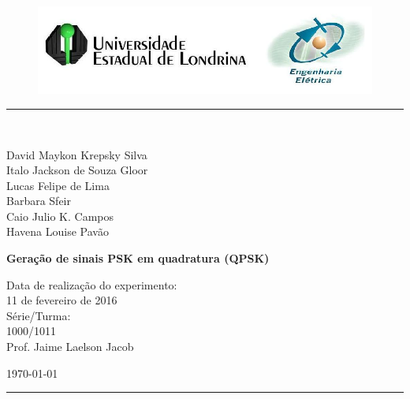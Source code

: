 \begin{titlepage}
\begin{center}
\begin{figure}[h]
\includegraphics[scale=0.76]{img/topdotitulo.png}
\end{figure}
\rule{\columnwidth}{1.5mm}
\

\large David Maykon Krepsky Silva	\\
\large Italo Jackson de Souza Gloor \\
\large Lucas Felipe de Lima \\
\large Barbara Sfeir \\
\large Caio Julio K. Campos \\
\large Havena Louise Pavão 


\vspace{3.0cm}
{\bf \Large Geração de sinais PSK em quadratura (QPSK)}
\vspace{3.0cm}

\begin{flushright}
Data de realização do experimento:\\
11 de fevereiro de 2016\\
Série/Turma:\\
1000/1011\\
Prof. Jaime Laelson Jacob
\end{flushright}

\vspace{3.2cm}
\today

\rule{\columnwidth}{1.3mm}
\end{center}
\end{titlepage}
